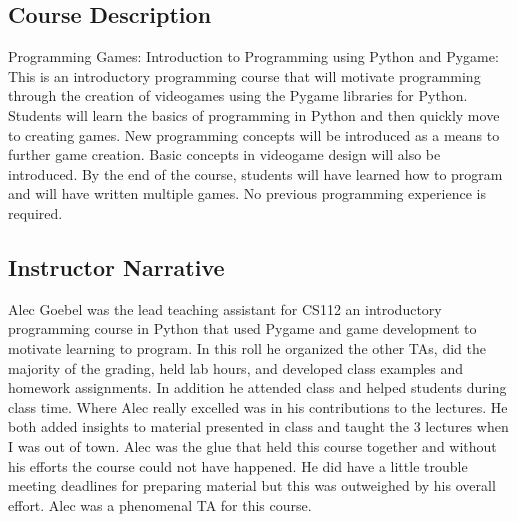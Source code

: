 
\subsection*{Course Description}
Programming Games: Introduction to Programming using Python and Pygame: This is
an introductory programming course that will motivate programming through the
creation of videogames using the Pygame libraries for Python. Students will
learn the basics of programming in Python and then quickly move to creating
games. New programming concepts will be introduced as a means to further game
creation. Basic concepts in videogame design will also be introduced. By the
end of the course, students will have learned how to program and will have
written multiple games. No previous programming experience is required.

\subsection*{Instructor Narrative}
Alec Goebel was the lead teaching assistant for CS112 an introductory
programming course in Python that used Pygame and game development to motivate
learning to program. In this roll he organized the other TAs, did the majority
of the grading, held lab hours, and developed class examples and homework
assignments. In addition he attended class and helped students during class
time. Where Alec really excelled was in his contributions to the lectures. He
both added insights to material presented in class and taught the 3 lectures
when I was out of town. Alec was the glue that held this course together and
without his efforts the course could not have happened. He did have a little
trouble meeting deadlines for preparing material but this was outweighed by his
overall effort. Alec was a phenomenal TA for this course.
